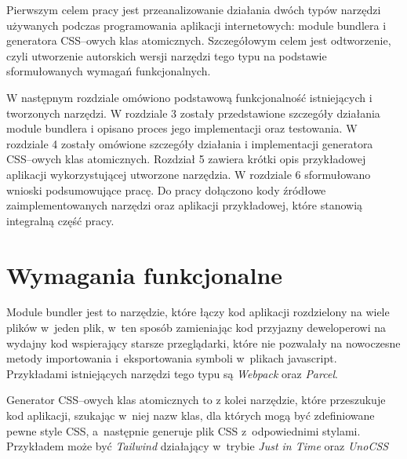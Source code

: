 \documentclass{SGGW-thesis}
\begin{document}
Pierwszym celem pracy jest przeanalizowanie działania dwóch typów narzędzi używanych podczas programowania aplikacji internetowych: module bundlera i generatora CSS--owych klas atomicznych. Szczegółowym celem jest odtworzenie, czyli utworzenie autorskich wersji narzędzi tego typu na podstawie sformułowanych wymagań funkcjonalnych.

W następnym rozdziale omówiono podstawową funkcjonalność istniejących i tworzonych narzędzi. W rozdziale 3 zostały przedstawione szczegóły działania module bundlera i opisano proces jego implementacji oraz testowania. W rozdziale 4 zostały omówione szczegóły działania i implementacji generatora CSS--owych klas atomicznych. Rozdział 5 zawiera krótki opis przykładowej aplikacji wykorzystującej utworzone narzędzia. W rozdziale 6 sformułowano wnioski podsumowujące pracę. Do pracy dołączono kody źródłowe zaimplementowanych narzędzi oraz aplikacji przykładowej, które stanowią integralną część pracy.

\chapter{Wymagania funkcjonalne}

Module bundler jest to narzędzie, które łączy kod aplikacji rozdzielony na wiele plików w~jeden plik, w~ten sposób zamieniając kod przyjazny deweloperowi na wydajny kod wspierający starsze przeglądarki, które nie pozwalały na nowoczesne metody importowania i~eksportowania symboli w~plikach javascript. Przykładami istniejących narzędzi tego typu są \emph{Webpack} oraz \emph{Parcel}.

Generator CSS--owych klas atomicznych to z kolei narzędzie, które przeszukuje kod aplikacji, szukając w~niej nazw klas, dla których mogą być zdefiniowane pewne style CSS, a~następnie generuje plik CSS z~odpowiednimi stylami. Przykładem może być \emph{Tailwind\cite{Tailwind_jit}} działający w~trybie \emph{Just in Time} oraz \emph{UnoCSS\cite{unocss}}
\end{document}
